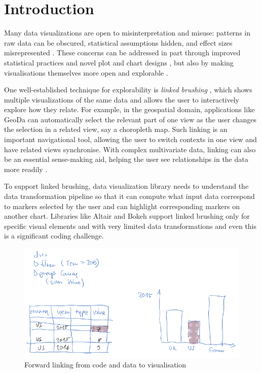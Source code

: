 \section{Introduction}

Many data visualizations are open to misinterpretation and misuse: patterns in raw data
can be obscured, statistical assumptions hidden, and effect sizes misrepresented
\cite{weissgerber15}. These concerns can be addressed in part through improved
statistical practices and novel plot and chart designs \cite{allen19}, but also
by making visualisations themselves more open and explorable
\cite{dragicevic19}.

One well-established technique for explorability is \emph{linked brushing}
\cite{fisherkeller75,becker87,buja91}, which shows multiple visualizations of the
same data and allows the user to interactively explore how they relate. For example,
in the geospatial domain, applications like GeoDa
\cite{anselin06} can automatically select the relevant part of one view as the
user changes the selection in a related view, say a choropleth map. Such linking
is an important navigational tool, allowing the user to switch contexts in one
view and have related views synchronise. With complex multivariate data, linking
can also be an essential sense-making aid, helping the user see relationships in
the data more readily \cite{he18}.

To support linked brushing, data visualization library needs to understand the
data transformation pipeline so that it can compute what input data correspond
to markers selected by the user and can highlight corresponding markers on another
chart. Libraries like Altair \cite{TBD} and Bokeh \cite{jolly18} support linked
brushing only for specific visual elements and with very limited data transformations
and even this is a significant coding challenge.

\begin{figure}[h]
\includegraphics[scale=0.35]{image/chart-fwd}
\caption{Forward linking from code and data to visualisation}
\end{figure}

